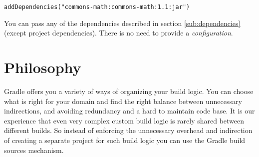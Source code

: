 \begin{Verbatim}[label=gradlesettings]
addDependencies("commons-math:commons-math:1.1:jar")	
\end{Verbatim}

You can pass any of the dependencies described in section \ref{sub:dependencies} (except project dependencies). There is no need to provide a \emph{configuration}.

\section{Philosophy} %
\label{sec:philosophy}
Gradle offers you a variety of ways of organizing your build logic. You can choose what is right for your domain and find the right balance between unnecessary indirections, and avoiding redundancy and a hard to maintain code base. 
It is our experience that even very complex custom build logic is rarely shared between different builds. So instead of enforcing the unnecessary overhead and indirection of creating a separate project for such build logic you can use the Gradle build sources mechanism.


